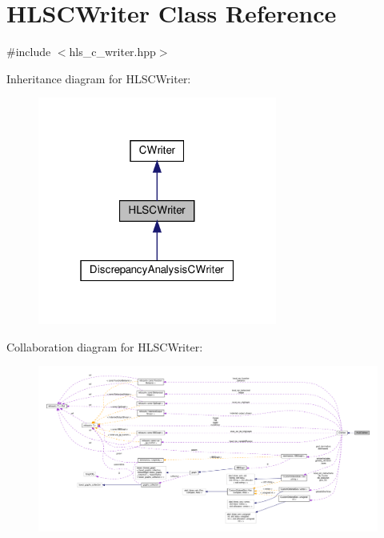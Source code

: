 \hypertarget{classHLSCWriter}{}\section{H\+L\+S\+C\+Writer Class Reference}
\label{classHLSCWriter}


{\ttfamily \#include $<$hls\+\_\+c\+\_\+writer.\+hpp$>$}



Inheritance diagram for H\+L\+S\+C\+Writer\+:
\nopagebreak
\begin{figure}[H]
\begin{center}
\leavevmode
\includegraphics[width=223pt]{dd/de9/classHLSCWriter__inherit__graph}
\end{center}
\end{figure}


Collaboration diagram for H\+L\+S\+C\+Writer\+:
\nopagebreak
\begin{figure}[H]
\begin{center}
\leavevmode
\includegraphics[width=350pt]{d9/d16/classHLSCWriter__coll__graph}
\end{center}
\end{figure}
